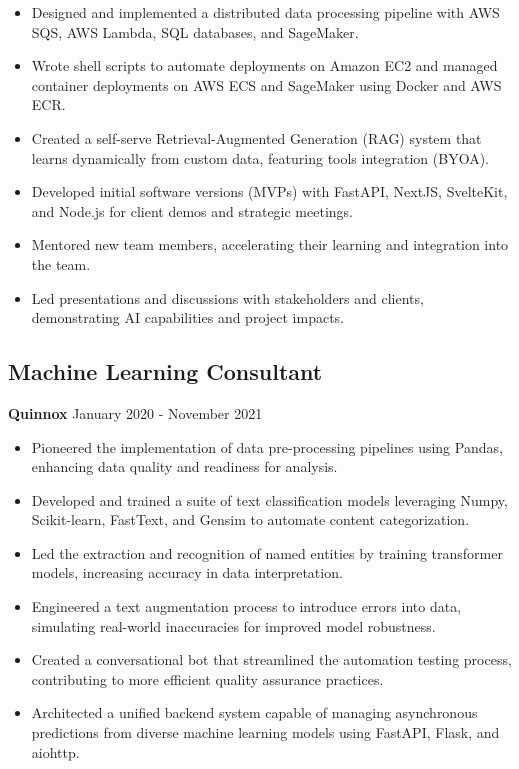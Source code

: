 \documentclass[11pt,a4paper]{article}
\begin{document}
\begin{itemize}
    \item Designed and implemented a distributed data processing pipeline with AWS SQS, AWS Lambda, SQL databases, and SageMaker.
    \item Wrote shell scripts to automate deployments on Amazon EC2 and managed container deployments on AWS ECS and SageMaker using Docker and AWS ECR.
    \item Created a self-serve Retrieval-Augmented Generation (RAG) system that learns dynamically from custom data, featuring tools integration (BYOA).
    \item Developed initial software versions (MVPs) with FastAPI, NextJS, SvelteKit, and Node.js for client demos and strategic meetings.
    \item Mentored new team members, accelerating their learning and integration into the team.
    \item Led presentations and discussions with stakeholders and clients, demonstrating AI capabilities and project impacts.
\end{itemize}


\subsection*{Machine Learning Consultant}
\textbf{Quinnox} \hfill January 2020 - November 2021\\
\begin{itemize}
    \item Pioneered the implementation of data pre-processing pipelines using Pandas, enhancing data quality and readiness for analysis.
    \item Developed and trained a suite of text classification models leveraging Numpy, Scikit-learn, FastText, and Gensim to automate content categorization.
    \item Led the extraction and recognition of named entities by training transformer models, increasing accuracy in data interpretation.
    \item Engineered a text augmentation process to introduce errors into data, simulating real-world inaccuracies for improved model robustness.
    \item Created a conversational bot that streamlined the automation testing process, contributing to more efficient quality assurance practices.
    \item Architected a unified backend system capable of managing asynchronous predictions from diverse machine learning models using FastAPI, Flask, and aiohttp.
\end{itemize}
\end{document}
